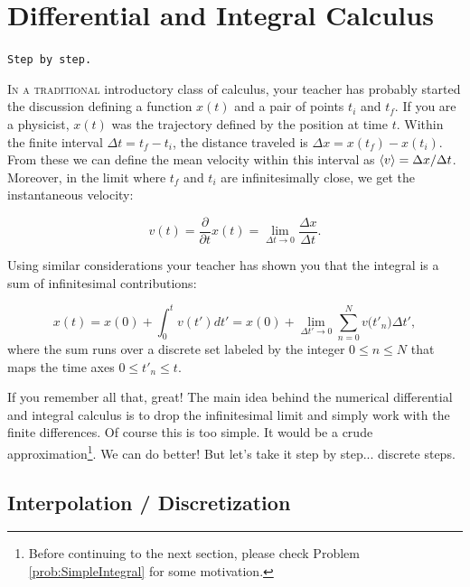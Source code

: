 \chapter{Differential and Integral Calculus}

\vspace*{-1cm}
\begin{flushright}
\texttt{Step by step.}
\end{flushright}

\lettrine[nindent=0.35em,lhang=0.40,loversize=0.3]{I}{n a traditional}
introductory class of calculus, your teacher has probably started the discussion defining a function $x(t)$ and a pair of points $t_i$ and $t_f$. If you are a physicist, $x(t)$ was the trajectory defined by the position at time $t$. Within the finite interval $\Delta t = t_f-t_i$, the distance traveled is $\Delta x = x(t_f) - x(t_i)$. From these we can define the mean velocity within this interval as $\langle v \rangle = \Delta x/\Delta t$. Moreover, in the limit where $t_f$ and $t_i$ are infinitesimally close, we get the instantaneous velocity:

\begin{equation}
 v(t) = \dfrac{\partial}{\partial t} x(t) = \lim_{\Delta t \rightarrow 0} \dfrac{\Delta x}{\Delta t}.
\end{equation}

Using similar considerations your teacher has shown you that the integral is a sum of infinitesimal contributions:

\begin{equation}
 x(t) = x(0) + \int_0^t v(t') dt' = x(0) + \lim_{\Delta t' \rightarrow 0} \sum_{n=0}^{N} v\big(t'_n\big) \Delta t',
\end{equation}
where the sum runs over a discrete set labeled by the integer $0 \leq n \leq N$ that maps the time axes $0 \leq t'_n \leq t$.

If you remember all that, great! The main idea behind the numerical differential and integral calculus is to drop the infinitesimal limit and simply work with the finite differences. Of course this is too simple. It would be a crude approximation\footnote{Before continuing to the next section, please check Problem \ref{prob:SimpleIntegral} for some motivation.}. We can do better! But let's take it step by step... discrete steps.

\section{Interpolation / Discretization}

